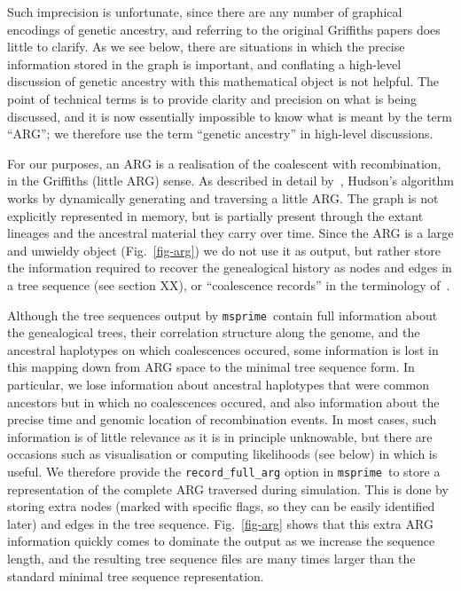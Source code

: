 \documentclass{article}
\newcommand{\msprime}[0]{\texttt{msprime}}
\begin{document}
Such
imprecision is unfortunate, since there are any number of graphical encodings of
genetic ancestry, and referring to the original Griffiths papers does little to
clarify. As we see below, there are situations in which the precise information
stored in the graph is important, and conflating a high-level
discussion of genetic ancestry with this mathematical object is not
helpful. The point of technical terms is to provide clarity and
precision on what is being discussed, and it is now essentially
impossible to know what is meant by the term ``ARG'';
we therefore use the term ``genetic ancestry'' in high-level
discussions.

For our purposes, an ARG is a realisation of the coalescent with
recombination, in the Griffiths (little ARG) sense.
As described in detail by~\cite{kelleher2016efficient}, Hudson's algorithm
works by dynamically generating and traversing a little ARG.
The graph is not explicitly represented in memory, but is partially
present through the extant lineages and the ancestral material they carry
over time. Since the ARG is a large and unwieldy object
(Fig.~\ref{fig-arg}) we do not use it as output, but
rather store the information required to recover the genealogical
history as nodes and edges in a tree sequence (see section XX),
or ``coalescence records'' in the terminology of~\citep{kelleher2016efficient}.

Although the tree sequences output by \msprime\ contain full information
about the genealogical trees, their correlation structure along the genome,
and the ancestral haplotypes on which coalescences occured, some information
is lost in this mapping down from ARG space to the minimal tree sequence
form. In particular, we lose
information about ancestral haplotypes that were common ancestors but
in which no coalescences occured, and also information about the precise time
and genomic location of recombination events. In most cases, such
information is of little relevance as it is in principle unknowable,
but there are occasions such as visualisation or computing likelihoods (see
below) in which is useful. We therefore provide
the \texttt{record\_full\_arg} option in \msprime\
to store a representation of the complete ARG traversed during simulation.
This is done by storing extra nodes (marked with specific flags, so they
can be easily identified later) and edges in the tree sequence.
Fig.~\ref{fig-arg} shows that this extra ARG information
quickly comes to dominate the output as we increase the sequence length,
and the resulting tree sequence files are many times larger
than the standard minimal tree sequence representation.
\end{document}
